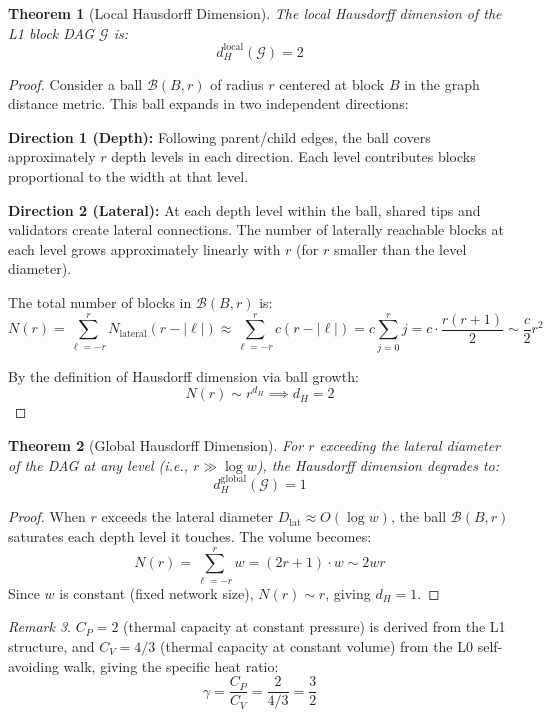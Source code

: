 \documentclass{article}
\newtheorem{theorem}{Theorem}[section]
\theoremstyle{definition}
\theoremstyle{remark}
\newtheorem{remark}[theorem]{Remark}
\theoremstyle{plain}
\begin{document}
\begin{theorem}[Local Hausdorff Dimension]
\label{thm:main}
The local Hausdorff dimension of the L1 block DAG $\mathcal{G}$ is:
\[
d_H^{\mathrm{local}}(\mathcal{G}) = 2
\]
\end{theorem}

\begin{proof}
Consider a ball $\mathcal{B}(B, r)$ of radius $r$ centered at block $B$ in the graph distance metric. This ball expands in two independent directions:

\textbf{Direction 1 (Depth):} Following parent/child edges, the ball covers approximately $r$ depth levels in each direction. Each level contributes blocks proportional to the width at that level.

\textbf{Direction 2 (Lateral):} At each depth level within the ball, shared tips and validators create lateral connections. The number of laterally reachable blocks at each level grows approximately linearly with $r$ (for $r$ smaller than the level diameter).

The total number of blocks in $\mathcal{B}(B, r)$ is:
\[
N(r) = \sum_{\ell = -r}^{r} N_{\mathrm{lateral}}(r - |\ell|) \approx \sum_{\ell = -r}^{r} c(r - |\ell|) = c \sum_{j=0}^{r} j = c \cdot \frac{r(r+1)}{2} \sim \frac{c}{2} r^2
\]

By the definition of Hausdorff dimension via ball growth:
\[
N(r) \sim r^{d_H} \implies d_H = 2
\]
\end{proof}

\begin{theorem}[Global Hausdorff Dimension]
For $r$ exceeding the lateral diameter of the DAG at any level (i.e., $r \gg \log w$), the Hausdorff dimension degrades to:
\[
d_H^{\mathrm{global}}(\mathcal{G}) = 1
\]
\end{theorem}

\begin{proof}
When $r$ exceeds the lateral diameter $D_{\mathrm{lat}} \approx O(\log w)$, the ball $\mathcal{B}(B, r)$ saturates each depth level it touches. The volume becomes:
\[
N(r) = \sum_{\ell=-r}^{r} w = (2r + 1) \cdot w \sim 2wr
\]
Since $w$ is constant (fixed network size), $N(r) \sim r$, giving $d_H = 1$.
\end{proof}

\begin{remark}
$C_P = 2$ (thermal capacity at constant pressure) is derived from the L1 structure, and $C_V = 4/3$ (thermal capacity at constant volume) from the L0 self-avoiding walk, giving the specific heat ratio:
\[
\gamma = \frac{C_P}{C_V} = \frac{2}{4/3} = \frac{3}{2}
\]
\end{remark}
\end{document}
